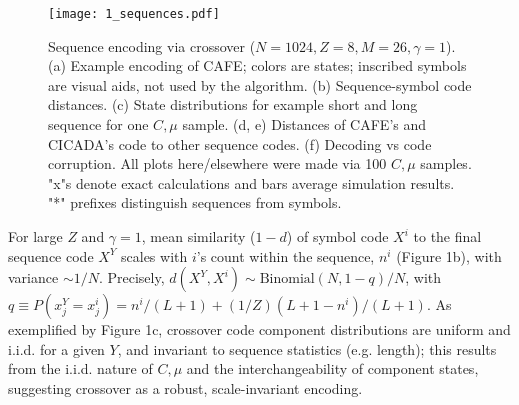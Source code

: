 \documentclass{article}
\begin{document}
\begin{figure}
  \centering
  \texttt{[image: 1\_sequences.pdf]}
  \caption{Sequence encoding via crossover ($N=1024, Z=8, M=26, \gamma=1$). (a) Example encoding of CAFE; colors are states; inscribed symbols are visual aids, not used by the algorithm. (b) Sequence-symbol code distances. (c) State distributions for example short and long sequence for one $C, \mu$ sample. (d, e) Distances of CAFE's and CICADA's code to other sequence codes. (f) Decoding vs code corruption. All plots here/elsewhere were made via 100 $C, \mu$ samples. "x"s denote exact calculations and bars average simulation results. "*" prefixes distinguish sequences from symbols.}
  \label{fig:1}
\end{figure}

For large $Z$ and $\gamma = 1$, mean similarity ($1-d$) of symbol code $X^i$ to the final sequence code $X^Y$ scales with $i$'s count within the sequence, $n^i$ (Figure 1b), with variance $\sim 1/N$. Precisely, $d(X^Y, X^i) \sim \textrm{Binomial}(N, 1-q)/N$, with $q \equiv P(x^Y_j = x^i_j) = n^i/(L+1) + (1/Z)(L+1-n^i)/(L+1)$. As exemplified by Figure 1c, crossover code component distributions are uniform and i.i.d. for a given $Y$, and invariant to sequence statistics (e.g. length); this results from the i.i.d. nature of $C, \mu$ and the interchangeability of component states, suggesting crossover as a robust, scale-invariant encoding.
\end{document}
